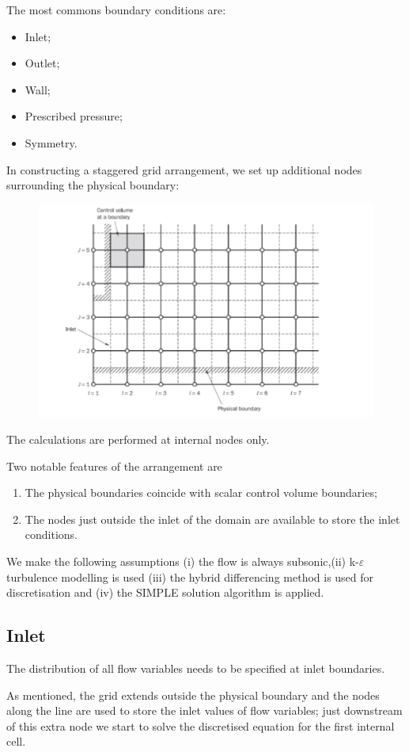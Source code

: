 \documentclass[a4paper, 15pt]{article}
\begin{document}
The most commons boundary conditions are: 
\begin{itemize}
	\item Inlet;
	\item Outlet;
	\item Wall;
	\item Prescribed pressure;
	\item Symmetry.
\end{itemize}
In
constructing a staggered grid arrangement, we set up additional nodes surrounding the
physical boundary:
\begin{figure}[H]
	\centering
	\label{fig:screenshot029}
	\includegraphics[width=0.5\linewidth]{fig/screenshot029}
\end{figure}
The
calculations are performed at internal nodes only. \newline

Two
notable features of the arrangement are 
\begin{enumerate}
	\item The physical boundaries coincide with scalar
	control volume boundaries;
	
	\item The nodes just outside the inlet of the domain are available to store the inlet conditions.
\end{enumerate}

We
make the following assumptions (i) the flow is always subsonic,(ii) k-$\varepsilon$ turbulence
modelling is used (iii) the hybrid differencing method is used for discretisation and (iv) the
SIMPLE solution algorithm is applied. 

\subsection*{Inlet}

The
distribution of all flow variables needs to be specified at inlet boundaries. 

As
mentioned, the grid extends outside the physical boundary and the nodes along the line are used to store the inlet values of flow variables; just
downstream of this extra node we start to solve the discretised equation for the first internal
cell. \newline 
\end{document}
